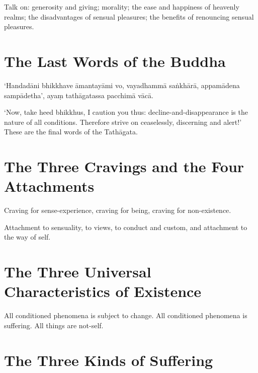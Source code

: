 Talk on: generosity and giving; morality; the ease and happiness of heavenly
realms; the disadvantages of sensual pleasures; the benefits of renouncing
sensual pleasures.


\ifhandbookedition
\vspace*{-\baselineskip}
\fi

\section*{The Last Words of the Buddha}

‘Handadāni bhikkhave āmantayāmi vo, vayadhammā saṅkhārā, appamādena sampādetha’,
ayaṃ tathāgatassa pacchimā vācā.

‘Now, take heed bhikkhus, I caution you thus: decline-and-disappearance is the
nature of all conditions. Therefore strive on ceaselessly, discerning and
alert!’ These are the final words of the Tathāgata.


\ifhandbookedition
\vspace*{-\baselineskip}
\fi

\section*{The Three Cravings and the Four Attachments}

Craving for sense-experience, craving for being, craving for non-existence.

Attachment to sensuality, to views, to conduct and custom, and attachment to the
way of self.


\ifhandbookedition
\vspace*{-\baselineskip}
\fi

\section*{The Three Universal Characteristics of Existence}

All conditioned phenomena is subject to change.
All conditioned phenomena is suffering.
All things are not-self.


\ifhandbookedition
\vspace*{-\baselineskip}
\fi

\section*{The Three Kinds of Suffering}

